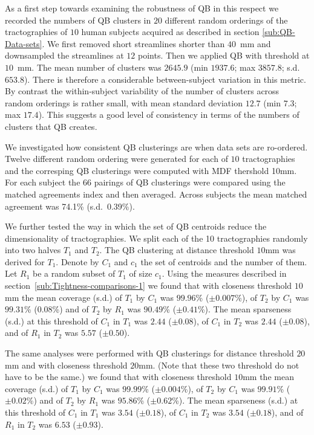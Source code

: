 \documentclass{bioinfo}
\begin{document}
As a first step towards examining the robustness of QB in this respect
we recorded the numbers of QB clusters in $20$ different random
orderings of the tractographies of $10$ human subjects acquired as
described in section \ref{sub:QB-Data-sets}. We first removed short
streamlines shorter than $40$~mm and downsampled the streamlines at $12$
points. Then we applied QB with threshold at $10$~mm. The mean number of
clusters was $2645.9$ (min $1937.6$; max $3857.8$; s.d.~$653.8$). There
is therefore a considerable between-subject variation in this metric. By
contrast the within-subject variability of the number of clusters across
random orderings is rather small, with mean standard deviation $12.7$
(min $7.3$; max $17.4$). This suggests a good level of consistency in
terms of the numbers of clusters that QB creates.

We investigated how consistent QB clusterings are when data sets are
ro-ordered.  Twelve different random ordering were generated for each of
$10$ tractographies and the corresping QB clusterings were computed with
MDF thershold 10mm.  For each subject the $66$ pairings of QB
clusterings were compared using the matched agreements index and then
averaged. Across subjects the mean matched agreement was 74.1\% (s.d.~0.39\%).

We further tested the way in which the set of QB centroids reduce the
dimensionality of tractographies. We split each of the 10 tractographies
randomly into two halves $T_1$ and $T_2$.  The QB clustering at distance
threshold $10$mm was derived for $T_1$. Denote by $C_1$ and $c_1$ the
set of centroids and the number of them. Let $R_1$ be a random subset of
$T_1$ of size $c_1$. Using the measures described in
section~\ref{sub:Tightness-comparisons-1} we found that with closeness
threshold $10$mm the mean coverage (s.d.) of $T_1$ by $C_1$ was
$99.96$\% ($\pm 0.007$\%), of $T_2$ by $C_1$ was $99.31$\% ($0.08$\%)
and of $T_2$ by $R_1$ was $90.49$\% ($\pm 0.41$\%). The mean sparseness
(s.d.) at this threshold of $C_1$ in $T_1$ was $2.44$ ($\pm 0.08$), of
$C_1$ in $T_2$ was $2.44$ ($\pm 0.08$), and of $R_1$ in $T_2$ was $5.57$
($\pm 0.50$).

The same analyses were performed with QB clusterings for distance
threshold $20$mm and with closeness threshold $20$mm. (Note that these
two threshold do not have to be the same.) we found that with closeness
threshold $10$mm the mean coverage (s.d.) of $T_1$ by $C_1$ was
$99.99$\% ($\pm 0.004$\%), of $T_2$ by $C_1$ was $99.91$\% ($\pm 0.02$\%)
and of $T_2$ by $R_1$ was $95.86$\% ($\pm 0.62$\%). The mean sparseness
(s.d.) at this threshold of $C_1$ in $T_1$ was $3.54$ ($\pm 0.18$), of
$C_1$ in $T_2$ was $3.54$ ($\pm 0.18$), and of $R_1$ in $T_2$ was $6.53$
($\pm 0.93$).
\end{document}
